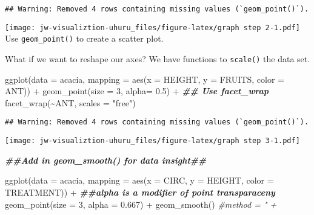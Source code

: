 \documentclass[
]{article}
\newenvironment{Shaded}{\begin{snugshade}}{\end{snugshade}}
\newcommand{\AttributeTok}[1]{\textcolor[rgb]{0.77,0.63,0.00}{#1}}
\newcommand{\CommentTok}[1]{\textcolor[rgb]{0.56,0.35,0.01}{\textit{#1}}}
\newcommand{\DecValTok}[1]{\textcolor[rgb]{0.00,0.00,0.81}{#1}}
\newcommand{\DocumentationTok}[1]{\textcolor[rgb]{0.56,0.35,0.01}{\textbf{\textit{#1}}}}
\newcommand{\FloatTok}[1]{\textcolor[rgb]{0.00,0.00,0.81}{#1}}
\newcommand{\FunctionTok}[1]{\textcolor[rgb]{0.00,0.00,0.00}{#1}}
\newcommand{\NormalTok}[1]{#1}
\newcommand{\SpecialCharTok}[1]{\textcolor[rgb]{0.00,0.00,0.00}{#1}}
\newcommand{\StringTok}[1]{\textcolor[rgb]{0.31,0.60,0.02}{#1}}
\begin{document}
\begin{verbatim}
## Warning: Removed 4 rows containing missing values (`geom_point()`).
\end{verbatim}

\texttt{[image: jw-visualiztion-uhuru\_files/figure-latex/graph step 2-1.pdf]}
Use \texttt{geom\_point()} to create a scatter plot.

What if we want to reshape our axes? We have functions to
\texttt{scale()} the data set.

\begin{Shaded}
\begin{Highlighting}[]
\FunctionTok{ggplot}\NormalTok{(}\AttributeTok{data =}\NormalTok{ acacia, }\AttributeTok{mapping =} \FunctionTok{aes}\NormalTok{(}\AttributeTok{x =}\NormalTok{ HEIGHT, }\AttributeTok{y =}\NormalTok{ FRUITS, }\AttributeTok{color =}\NormalTok{ ANT)) }\SpecialCharTok{+}
  \FunctionTok{geom\_point}\NormalTok{(}\AttributeTok{size =} \DecValTok{3}\NormalTok{, }\AttributeTok{alpha=} \FloatTok{0.5}\NormalTok{) }\SpecialCharTok{+}
\DocumentationTok{\#\# Use facet\_wrap }
  \FunctionTok{facet\_wrap}\NormalTok{(}\SpecialCharTok{\textasciitilde{}}\NormalTok{ANT, }\AttributeTok{scales =} \StringTok{"free"}\NormalTok{)}
\end{Highlighting}
\end{Shaded}

\begin{verbatim}
## Warning: Removed 4 rows containing missing values (`geom_point()`).
\end{verbatim}

\texttt{[image: jw-visualiztion-uhuru\_files/figure-latex/graph step 3-1.pdf]}

\begin{Shaded}
\begin{Highlighting}[]
\DocumentationTok{\#\#Add in geom\_smooth() for data insight\#\#}
  
\FunctionTok{ggplot}\NormalTok{(}\AttributeTok{data =}\NormalTok{ acacia, }\AttributeTok{mapping =} \FunctionTok{aes}\NormalTok{(}\AttributeTok{x =}\NormalTok{ CIRC, }\AttributeTok{y =}\NormalTok{ HEIGHT, }\AttributeTok{color =}\NormalTok{ TREATMENT)) }\SpecialCharTok{+}
  \DocumentationTok{\#\#alpha is a modifier of point transparaceny}
  \FunctionTok{geom\_point}\NormalTok{(}\AttributeTok{size =} \DecValTok{3}\NormalTok{, }\AttributeTok{alpha =} \FloatTok{0.667}\NormalTok{) }\SpecialCharTok{+} 
  \FunctionTok{geom\_smooth}\NormalTok{() }\CommentTok{\#method = " +}
\end{Highlighting}
\end{Shaded}
\end{document}
